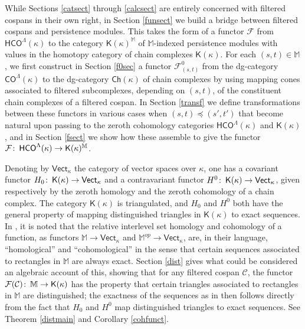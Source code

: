 \documentclass[11pt]{amsart}
\theoremstyle{definition}
\theoremstyle{remark}
\numberwithin{equation}{section}
\def\co{\colon\thinspace}
\begin{document}
While Sections \ref{catsect} through \ref{calcsect} are entirely concerned with filtered cospans in their own right, in Section \ref{funsect} we build a bridge between filtered cospans and persistence modules.  This takes the form of a functor $\mathcal{F}$ from $\mathsf{HCO}^{\Lambda}(\kappa)$ to the category $\mathsf{K}(\kappa)^{\mathbb{M}}$ of $\mathbb{M}$-indexed persistence modules with values in the homotopy category of chain complexes $\mathsf{K}(\kappa)$.  For each $(s,t)\in \mathbb{M}$, we first construct in Section \ref{f0sec} a functor $\mathcal{F}_{(s,t)}^{0}$ from the dg-category $\mathsf{CO}^{\Lambda}(\kappa)$ to the dg-category $\mathsf{Ch}(\kappa)$ of chain complexes by using mapping cones associated to filtered subcomplexes, depending on $(s,t)$, of the constituent chain complexes of a filtered cospan.  In Section \ref{transf} we define transformations between these functors in various cases when $(s,t)\preceq (s',t')$ that become natural upon passing to the zeroth cohomology categories $\mathsf{HCO}^{\Lambda}(\kappa)$ and $\mathsf{K}(\kappa)$, and in Section \ref{fsect} we show how these assemble to give the functor $\mathcal{F}\co \mathsf{HCO}^{\Lambda}(\kappa)\to \mathsf{K}(\kappa)^{\mathbb{M}}$.

Denoting by $\mathsf{Vect}_{\kappa}$ the category of vector spaces over $\kappa$, one has a covariant functor $H_0\co \mathsf{K}(\kappa)\to \mathsf{Vect}_{\kappa}$ and a contravariant functor $H^0\co \mathsf{K}(\kappa)\to \mathsf{Vect}_{\kappa}$, given respectively by the zeroth homology and the zeroth cohomology of a chain complex.  The category $\mathsf{K}(\kappa)$ is triangulated, and $H_0$ and $H^0$ both have the general property of mapping distinguished triangles in $\mathsf{K}(\kappa)$ to exact sequences.  In \cite{BBF21}, it is noted that the relative interlevel set homology and cohomology of a function, as functors $\mathbb{M}\to\mathsf{Vect}_{\kappa}$ and $\mathbb{M}^{op}\to\mathsf{Vect}_{\kappa}$, are, in their language, ``homological'' and ``cohomological'' in the sense that certain sequences associated to rectangles in $\mathbb{M}$ are always exact.  Section \ref{dist} gives what could be considered an algebraic account of this, showing that for any filtered cospan $\mathcal{C}$, the functor $\mathcal{F}(\mathcal{C})\co \mathbb{M}\to\mathsf{K}(\kappa)$ has the property that certain triangles associated to rectangles in $\mathbb{M}$ are distinguished; the exactness of the sequences as in \cite{BBF21} then follows directly from the fact that $H_0$ and $H^0$ map distinguished triangles to exact sequences.  See Theorem \ref{distmain} and Corollary \ref{cohfunct}.
\end{document}
